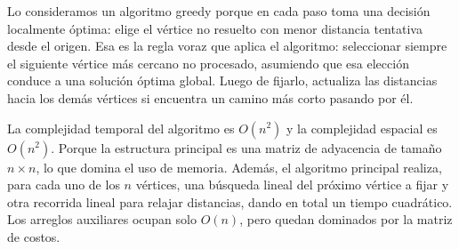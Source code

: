 Lo consideramos un algoritmo greedy porque en cada paso toma una decisión localmente óptima: elige el vértice no resuelto con menor distancia tentativa desde el origen. Esa es la regla voraz que aplica el algoritmo: seleccionar siempre el siguiente vértice más cercano no procesado, asumiendo que esa elección conduce a una solución óptima global. Luego de fijarlo, actualiza las distancias hacia los demás vértices si encuentra un camino más corto pasando por él.

La complejidad temporal del algoritmo es $O(n^2)$ y la complejidad espacial es $O(n^2)$. Porque la estructura principal es una matriz de adyacencia de tamaño $n \times n$, lo que domina el uso de memoria. Además, el algoritmo principal realiza, para cada uno de los $n$ vértices, una búsqueda lineal del próximo vértice a fijar y otra recorrida lineal para relajar distancias, dando en total un tiempo cuadrático. Los arreglos auxiliares ocupan solo $O(n)$, pero quedan dominados por la matriz de costos.